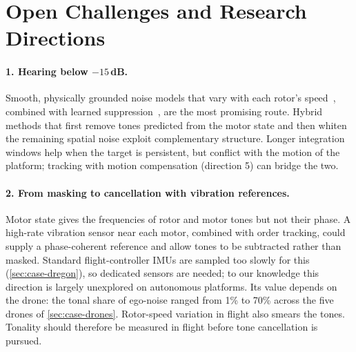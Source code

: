 \section{Open Challenges and Research Directions}
\label{sec:challenges}

\paragraph{1. Hearing below $-15$\,dB.}
Smooth, physically grounded noise models that vary with each rotor's speed~\cite{yen2023ncm}, combined with learned suppression~\cite{wang2022drone,gulli2025rotor}, are the most promising route.
Hybrid methods that first remove tones predicted from the motor state and then whiten the remaining spatial noise exploit complementary structure.
Longer integration windows help when the target is persistent, but conflict with the motion of the platform; tracking with motion compensation (direction 5) can bridge the two.

\paragraph{2. From masking to cancellation with vibration references.}
Motor state gives the frequencies of rotor and motor tones but not their phase.
A high-rate vibration sensor near each motor, combined with order tracking, could supply a phase-coherent reference and allow tones to be subtracted rather than masked.
Standard flight-controller IMUs are sampled too slowly for this (\cref{sec:case-dregon}), so dedicated sensors are needed; to our knowledge this direction is largely unexplored on autonomous platforms.
Its value depends on the drone: the tonal share of ego-noise ranged from 1\% to 70\% across the five drones of \cref{sec:case-drones}. Rotor-speed variation in flight also smears the tones. Tonality should therefore be measured in flight before tone cancellation is pursued.

